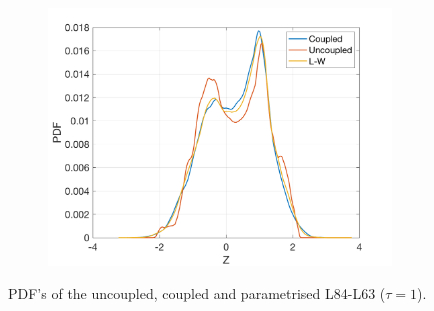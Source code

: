 \documentclass[12pt]{article}
\begin{document}
\begin{figure}[H]
\begin{subfigure}[b]{0.3\textwidth}
		\includegraphics[width=\textwidth]{plots/l84l63/pdf_z_1.png}
	\end{subfigure}
	\caption{\label{pdfucp1}PDF's of the uncoupled, coupled and parametrised L84-L63 ($\tau=1$).}
\end{figure}
\end{document}
